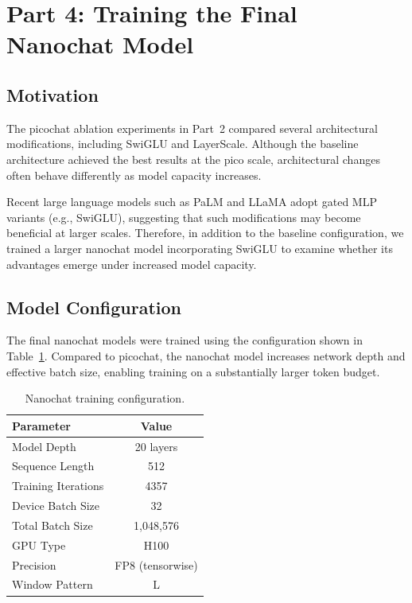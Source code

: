 \section{Part 4: Training the Final Nanochat Model}

\subsection{Motivation}

The picochat ablation experiments in Part~2 compared several architectural
modifications, including SwiGLU and LayerScale. Although the baseline
architecture achieved the best results at the pico scale, architectural
changes often behave differently as model capacity increases.

Recent large language models such as PaLM and LLaMA adopt gated MLP
variants (e.g., SwiGLU), suggesting that such modifications may become
beneficial at larger scales. Therefore, in addition to the baseline
configuration, we trained a larger nanochat model incorporating SwiGLU
to examine whether its advantages emerge under increased model capacity.

\subsection{Model Configuration}

The final nanochat models were trained using the configuration shown in
Table~\ref{tab:nano_config}. Compared to picochat, the nanochat model
increases network depth and effective batch size, enabling training on
a substantially larger token budget.

\begin{table}[H]
\centering
\begin{tabular}{lc}
\hline
\textbf{Parameter} & \textbf{Value} \\
\hline
Model Depth & 20 layers \\
Sequence Length & 512 \\
Training Iterations & 4357 \\
Device Batch Size & 32 \\
Total Batch Size & 1,048,576 \\
GPU Type & H100 \\
Precision & FP8 (tensorwise) \\
Window Pattern & L \\
\hline
\end{tabular}
\caption{Nanochat training configuration.}
\label{tab:nano_config}
\end{table}

